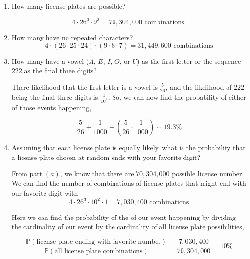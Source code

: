 \documentclass[12pt]{article}
\begin{document}
\begin{center}
\begin{enumerate}[label=(\alph*)]
\item How many license plates are possible?

\begin{equation*}
4 \cdot 26^3 \cdot 9^3=70,304,000 \text{ combinations}.
\end{equation*}

\item How many have no repeated characters?
\begin{equation*}
4 \cdot (26 \cdot 25 \cdot 24) \cdot (9 \cdot 8 \cdot 7) = 31,449,600 \text{ combinations} 
\end{equation*}

\item How many have a vowel ($A$, $E$, $I$, $O$, or $U$) as the first letter or the sequence $222$ as the final three digits?

\vspace{.5cm}
\noindent
There likelihood that the first letter is a vowel is $\frac{5}{26}$, and the likelihood of $222$ being the final three digits is $\frac{1}{10^3}$. So, we can now find the probability of either of those events happening,

\begin{equation*}
\frac{5}{26} + \frac{1}{1000} - (\frac{5}{26} \cdot \frac{1}{1000}) \sim 19.3 \%
\end{equation*}

\item Assuming that each license plate is equally likely, what is the probability that a license plate chosen at random ends with your favorite digit?

\vspace{.5cm}
\noindent
From part $(a)$, we know that there are $70,304,000$ possible license number. We can find the number of combinations of license plates that might end with our favorite digit with
\begin{equation*}
4 \cdot 26^3 \cdot 10^2 \cdot 1 = 7,030,400 \text{ combinations} 
\end{equation*}

\noindent
Here we can find the probability of the of our event happening by dividing the cardinality of our event by the cardinality of all license plate possibilities,

\begin{equation*}
\frac{\mathbb{P}(\text{license plate ending with favorite number})}{\mathbb{P}(\text{all license plate combinations})} = \frac{7,030,400}{70,304,000} = 10\%
\end{equation*}

\end{enumerate}
\end{center}

\end{document}
